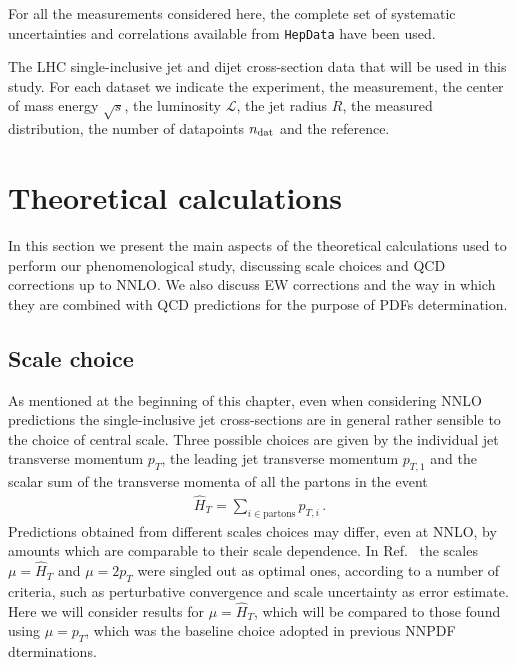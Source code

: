 %
For all the measurements considered here, the complete set of systematic uncertainties and correlations available from
{\tt HepData} have been used.

\begin{table}[!t]
    \centering
    \scriptsize
    \renewcommand{\arraystretch}{1.90}
    
    \vspace{0.3cm}
    \caption{\small The LHC single-inclusive jet and dijet cross-section data
       that will be used  in this study. For each dataset we indicate the experiment,
       the measurement, the center of mass energy $\sqrt{s}$, the luminosity 
       $\mathcal{L}$, the jet radius $R$, the measured distribution, the number of 
       datapoints $n_{\rm dat}$ and the reference.}
    \label{tab:input_datasets}
\end{table}
    


\section{Theoretical calculations}
\label{sec:jets_th}
In this section we present the main aspects of the theoretical calculations used to perform
our phenomenological study, discussing scale choices and QCD corrections up to NNLO.
We also discuss EW corrections and the way in which they are combined with QCD predictions for the 
purpose of PDFs determination.

\subsection{Scale choice}
As mentioned at the beginning of this chapter, even when considering NNLO predictions
the single-inclusive jet cross-sections are in general
rather sensible to the choice of central scale.
Three possible choices are given by the individual jet transverse momentum $p_T$, 
the leading jet transverse momentum $p_{T,1}$ and the scalar sum of the transverse momenta of all the partons
in the event 
\begin{align}
    \hat{H}_T = \sum_{i\in\text{partons}} p_{T,i}\,.
\end{align}
Predictions obtained from different scales choices may differ, even at NNLO, by amounts which are comparable to their
scale dependence.
In Ref.~\cite{Currie:2018xkj} the scales $\mu = \hat{H}_T $ and $\mu = 2p_T$ were singled out as optimal ones,
according to a number of criteria, such as perturbative convergence and scale uncertainty as error estimate.
Here we will consider results for $\mu = \hat{H}_T$, which will be compared to those found using $\mu=p_T$,
which was the baseline choice adopted in previous NNPDF dterminations.

